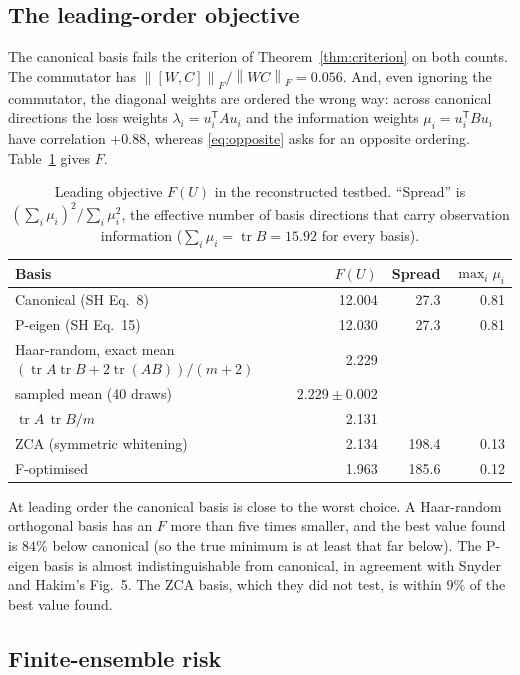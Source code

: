 \documentclass[11pt,a4paper]{article}
\numberwithin{equation}{section}
\theoremstyle{remark}\newtheorem{remark}[theorem]{Remark}
\newcommand{\tr}{\operatorname{tr}}
\newcommand{\T}{^{\mathsf T}}
\newcommand{\norm}[1]{\left\lVert#1\right\rVert}
\begin{document}
\subsection{The leading-order objective}

The canonical basis fails the criterion of Theorem~\ref{thm:criterion} on both counts. The
commutator has \(\norm{[W,C]}_F/\norm{WC}_F=0.056\). And, even ignoring the commutator, the
diagonal weights are ordered the wrong way: across canonical directions the loss weights
\(\lambda_i=u_i\T Au_i\) and the information weights \(\mu_i=u_i\T Bu_i\) have correlation
\(+0.88\), whereas \eqref{eq:opposite} asks for an opposite ordering. Table~\ref{tab:sh-F}
gives \(F\).

\begin{table}[ht]
\centering
\caption{Leading objective \(F(U)\) in the reconstructed testbed. ``Spread'' is
\((\sum_i\mu_i)^2/\sum_i\mu_i^2\), the effective number of basis directions that carry observation
information (\(\sum_i\mu_i=\tr B=15.92\) for every basis).}
\label{tab:sh-F}
\small
\begin{tabular}{lrrr}
\toprule
Basis & \(F(U)\) & Spread & \(\max_i\mu_i\)\\
\midrule
Canonical (SH Eq.~8) & 12.004 & 27.3 & 0.81\\
P-eigen (SH Eq.~15) & 12.030 & 27.3 & 0.81\\
Haar-random, exact mean \((\tr A\tr B+2\tr(AB))/(m+2)\) & 2.229 & & \\
\quad sampled mean (40 draws) & \(2.229\pm0.002\) & & \\
\quad \(\tr A\,\tr B/m\) & 2.131 & & \\
ZCA (symmetric whitening) & 2.134 & 198.4 & 0.13\\
F-optimised & 1.963 & 185.6 & 0.12\\
\bottomrule
\end{tabular}
\end{table}

At leading order the canonical basis is close to the worst choice. A Haar-random orthogonal
basis has an \(F\) more than five times smaller, and the best value found is \(84\%\) below
canonical (so the true minimum is at least that far below). The
P-eigen basis is almost indistinguishable from canonical, in agreement with Snyder and Hakim's
Fig.~5. The ZCA basis, which they did not test, is within \(9\%\) of the best value found.

\subsection{Finite-ensemble risk}
\end{document}
